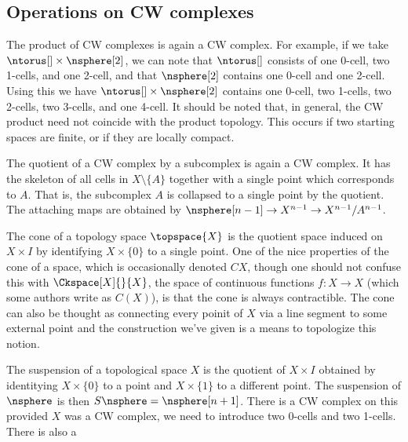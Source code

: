     \subsection{Operations on CW complexes}
        The product of CW complexes is again a CW complex. For example,
        if we take $\ntorus[]\times\nsphere[2]$, we can note that
        $\ntorus[]$ consists of one 0-cell, two 1-cells, and one 2-cell,
        and that $\nsphere[2]$ contains one 0-cell and one 2-cell. Using
        this we have $\ntorus[]\times\nsphere[2]$ contains
        one 0-cell, two 1-cells, two 2-cells, two 3-cells, and one
        4-cell. It should be noted that, in general, the CW product need
        not coincide with the product topology. This occurs if two
        starting spaces are finite, or if they are locally compact.
        \par\hfill\par
        The quotient of a CW complex by a subcomplex is again a CW
        complex. It has the skeleton of all cells in $X\setminus\{A\}$
        together with a single point which corresponds to $A$. That is,
        the subcomplex $A$ is collapsed to a single point by the
        quotient. The attaching maps are obtained by
        $\nsphere[n-1]\rightarrow{X}^{n-1}\rightarrow{X}^{n-1}/A^{n-1}$.
        \par\hfill\par
        The cone of a topology space $\topspace{X}$ is the quotient
        space induced on $X\times{I}$ by identifying $X\times\{0\}$ to a
        single point. One of the nice properties of the cone of a space,
        which is occasionally denoted $CX$, though one should not
        confuse this with $\Ckspace[X]{}{X}$, the space of continuous
        functions $f:X\rightarrow{X}$ (which some authors write as
        $C(X)$), is that the cone is always contractible. The cone can
        also be thought as connecting every poinit of $X$ via a line
        segment to some external point and the construction we've given
        is a means to topologize this notion.
        \par\hfill\par
        The suspension of a topological space $X$ is the quotient of
        $X\times{I}$ obtained by identitying $X\times\{0\}$ to a point
        and $X\times\{1\}$ to a different point. The suspension of
        $\nsphere$ is then $S\nsphere=\nsphere[n+1]$. There is a CW
        complex on this provided $X$ was a CW complex, we need to
        introduce two 0-cells and two 1-cells. There is also a
